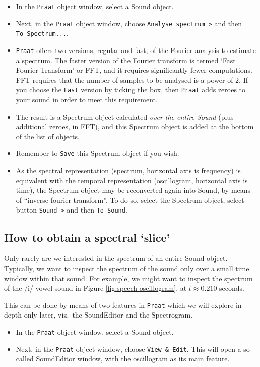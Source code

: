\documentclass[
]{book}
\begin{document}
\begin{itemize}
\item
  In the \texttt{Praat} object window, select a Sound object.
\item
  Next, in the \texttt{Praat} object window, choose \texttt{Analyse\ spectrum\ \textgreater{}} and then \texttt{To\ Spectrum...}.
\item
  \texttt{Praat} offers two versions, regular and fast, of the Fourier analysis to estimate a spectrum. The faster version of the Fourier transform is termed `Fast Fourier Transform' or FFT, and it requires significantly fewer computations. FFT requires that the number of samples to be analysed is a power of \(2\). If you choose the \texttt{Fast} version by ticking the box, then \texttt{Praat} adds zeroes to your sound in order to meet this requirement.
\item
  The result is a Spectrum object calculated \emph{over the entire Sound} (plus additional zeroes, in FFT), and this Spectrum object is added at the bottom of the list of objects.
\item
  Remember to \texttt{Save} this Spectrum object if you wish.
\item
  As the spectral representation (spectrum, horizontal axis is frequency) is equivalent with the temporal representation (oscillogram, horizontal axis is time), the Spectrum object may be reconverted again into Sound, by means of ``inverse fourier transform''.
  To do so, select the Spectrum object, select button \texttt{Sound\ \textgreater{}} and then \texttt{To\ Sound}.
\end{itemize}

\label{box-praatspectralslice}
\subsection{How to obtain a spectral `slice'}\label{how-to-obtain-a-spectral-slice}

Only rarely are we interested in the spectrum of an entire Sound object. Typically, we want to inspect the spectrum of the sound only over a small time window within that sound. For example, we might want to inspect the spectrum of the /i/ vowel sound in Figure \ref{fig:speech-oscillogram}, at \(t \approx 0.210\) seconds.

This can be done by means of two features in \texttt{Praat} which we will explore in depth only later, viz.~the SoundEditor and the Spectrogram.

\begin{itemize}
\item
  In the \texttt{Praat} object window, select a Sound object.
\item
  Next, in the \texttt{Praat} object window, choose \texttt{View\ \&\ Edit}. This will open a so-called SoundEditor window, with the oscillogram as its main feature.
\end{itemize}
\end{document}
